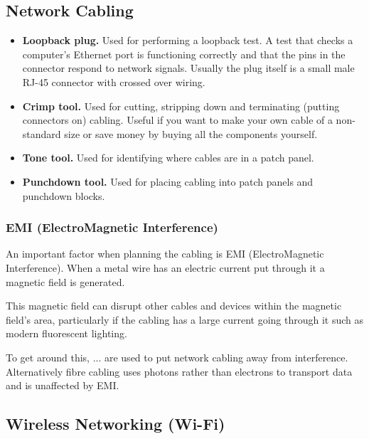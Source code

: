 \documentclass{article}
\begin{document}

\subsection{Network Cabling}


\begin{itemize}
    \item \textbf{Loopback plug.} Used for performing a loopback test. A test that checks a computer's Ethernet port is functioning correctly and that the pins in the connector respond to network signals. Usually the plug itself is a small male RJ-45 connector with crossed over wiring.
    \item \textbf{Crimp tool.} Used for cutting, stripping down and terminating (putting connectors on) cabling. Useful if you want to make your own cable of a non-standard size or save money by buying all the components yourself.
    \item \textbf{Tone tool.} Used for identifying where cables are in a patch panel.
    \item \textbf{Punchdown tool.} Used for placing cabling into patch panels and punchdown blocks.
\end{itemize}

\subsubsection{EMI (ElectroMagnetic Interference)}

An important factor when planning the cabling is EMI (ElectroMagnetic Interference). When a metal wire has an electric current put through it a magnetic field is generated.

This magnetic field can disrupt other cables and devices within the magnetic field's area, particularly if the cabling has a large current going through it such as modern fluorescent lighting.

To get around this, ... are used to put network cabling away from interference. Alternatively fibre cabling uses photons rather than electrons to transport data and is unaffected by EMI.


\subsection{Wireless Networking (Wi-Fi)}
\end{document}
